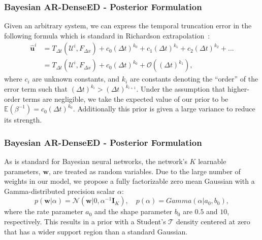 \documentclass{beamer}
\theoremstyle{remark}
\begin{document}
\begin{frame}
\frametitle{Bayesian AR-DenseED - Posterior Formulation}
Given an arbitrary system, we can express the temporal truncation error in the following formula which is standard in Richardson extrapolation~\cite{richardson1927viii}:
 \begin{align}
    \hat{\bm{u}}^{i} &= T_{\Delta t}\left(\bm{\mathcal{U}}^{i}, F_{\Delta x}\right) + c_{0}\left(\Delta t\right)^{k_{0}} + c_{1}\left(\Delta t\right)^{k_{1}} + c_{2}\left(\Delta t\right)^{k_{2}} + \dots \nonumber \\
     &= T_{\Delta t}\left(\bm{\mathcal{U}}^{i}, F_{\Delta x}\right) + c_{0}\left(\Delta t\right)^{k_{0}} + \mathcal{O}\left(\left(\Delta t\right)^{k_{1}}\right),\label{eq:richard0}
\end{align}
where $c_{i}$ are unknown constants, and $k_{i}$ are constants denoting the ``order'' of the error term such that $\left(\Delta t\right)^{k_{i}} > \left(\Delta t\right)^{k_{i+1}}$.
Under the assumption that higher-order terms are negligible, we take the expected value of our prior to be $\mathbb{E}\left(\beta^{-1}\right)=c_{0}\left(\Delta t\right)^{k_{0}}$. 
Additionally this prior is given a large variance to reduce its strength.
\end{frame}

\begin{frame}
\frametitle{Bayesian AR-DenseED - Posterior Formulation}
As is standard for Bayesian neural networks, the network's $K$ learnable parameters, $\textbf{w}$, are treated as random variables.
Due to the large number of weights in our model, we propose a fully factorizable zero mean Gaussian with a Gamma-distributed precision scalar $\alpha$:
\begin{equation}
    p\left(\mathbf{w}|\alpha\right)=\mathcal{N}\left(\mathbf{w}|0, \alpha^{-1}\bm{I}_{K}\right), \quad p\left(\alpha\right) = Gamma\left(\alpha|a_{0},b_{0}\right),
\end{equation}
where the rate parameter $a_{0}$ and the shape parameter $b_{0}$ are $0.5$ and $10$,  respectively.
This results in a prior with a Student's $\mathcal{T}$ density centered at zero that has a wider support region than a standard Gaussian.

\end{frame}
\end{document}
